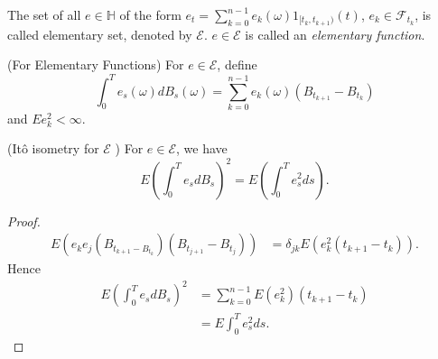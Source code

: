 \begin{definition}
The set of all $e \in \mathbb{H}$ of the form $e_t = \sum_{k=0}^{n-1} e_k(\omega) 1_{[t_k, t_{k+1})}(t)$, $e_k \in \mathcal{F}_{t_k}$, is called elementary set, denoted by $\mathcal{E}$.
$e \in \mathcal{E}$ is called an \textit{elementary function}.
\end{definition}

\begin{definition}(For Elementary Functions)
	For $e \in \mathcal{E}$, define
	\[
		\int _0^T e_s(\omega) d B_s(\omega)
		= \sum_{k=0}^{n-1} e_k(\omega) \left( B_{t_{k+1}} - B_{t_k} \right) 
	\] 
	and $E e_k^2 < \infty $.
\end{definition}

\begin{lemma}
	(Itô isometry for $\mathcal{E}$ )
	For $e \in \mathcal{E}$, we have
	\[
		E\left( \int _0^T e_s dB_s \right) ^2 = E\left( \int _0^T e_s^2 d s \right) 
	.\] 
\end{lemma}
\begin{proof}
	\begin{align*}
		E\left( e_k e_j \left( B_{t_{k+1} - B_{t_k}} \right) \left( B_{t_{j+1}} - B_{t_j} \right)  \right) 
		&= \delta_{jk } E\left( e_k^2 \left( t_{k+1} - t_k \right)  \right) 
	.\end{align*}
	Hence
	\begin{align*}
		E\left( \int _0^T e_s d B_s \right) ^2
		&= \sum_{k=0}^{n-1} E(e_k^2) \left( t_{k+1} - t_k \right)  \\
		&= E \int _0^T e_s^2 ds
	.\end{align*}
\end{proof}

